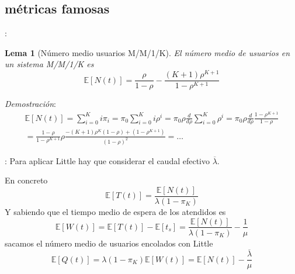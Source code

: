 \documentclass[xcolor={x11names}]{beamer}
\newtheorem{lema}{Lema}[section]
\begin{document}
\subsection{métricas famosas}
\begin{frame}{\secname: \subsecname}
    \begin{lema}[Número medio usuarios M/M/1/K]
        El número medio de usuarios en un
        sistema M/M/1/K es
        \begin{equation}
            \mathbb{E}[N(t)]=
            \frac{\rho}{1-\rho}-
            \frac{(K+1)\rho^{K+1}}{1-\rho^{K+1}}
        \end{equation}
    \end{lema}

    \vfill

    \textit{Demostración}:
    \begin{multline*}
        \mathbb{E}[N(t)]=
        \sum_{i=0}^{K}i \pi_i
        =\pi_0\sum_{i=0}^K i\rho^i
        =\pi_0\rho\frac{d}{d\rho}
        \sum_{i=0}^K\rho^i
        = \pi_0\rho \frac{d}{d\rho}
        \frac{1-\rho^{K+1}}{1-\rho}\\
        =\frac{1-\rho}{1-\rho^{K+1}}\rho
        \frac{-(K+1)\rho^K(1-\rho)+(1-\rho^{K+1})}{(1-\rho)^2}=\ldots
    \end{multline*}
\end{frame}



\begin{frame}{\secname: \subsecname}
    Para aplicar Little hay que considerar
    el caudal efectivo $\overline{\lambda}$.
    \begin{figure}
        \resizebox{!}{.15\textwidth}{%
            
        }
    \end{figure}
    En concreto
    \begin{equation*}
        \mathbb{E}[T(t)]=
        \frac{\mathbb{E}[N(t)]}{\lambda(1-\pi_K)}
    \end{equation*}
    Y sabiendo que el tiempo medio de
    espera de los atendidos es
    \begin{equation*}
        \mathbb{E}[W(t)]=
        \mathbb{E}[T(t)]-\mathbb{E}[t_s]
        =\frac{\mathbb{E}[N(t)]}{\lambda(1-\pi_K)}
        - \frac{1}{\mu}
    \end{equation*}
    sacamos el número medio de usuarios
    encolados con Little
    \begin{equation*}
        \mathbb{E}[Q(t)]=
        \lambda(1-\pi_K)
        \mathbb{E}[W(t)]=
        \mathbb{E}[N(t)]-
        \frac{\overline{\lambda}}{\mu}
    \end{equation*}
\end{frame}
\end{document}
